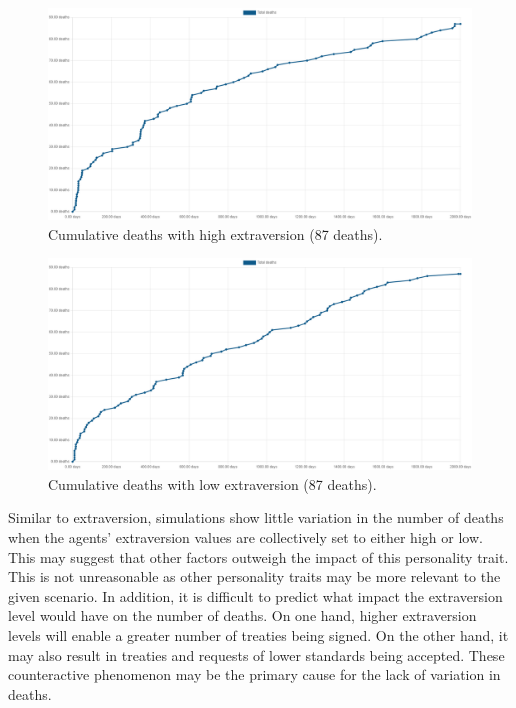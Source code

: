\begin{figure}[H]
    \begin{center}
        \includegraphics[scale=0.25]{009_team_7_agent_design/Images/Cumulative Deaths, With Treaties, T7Only, 2000days, 20food, High extra, 87deaths.png}
    \end{center}
    \caption{Cumulative deaths with high extraversion (87 deaths).}
    \label{fig: High Extraversion}
\end{figure}

\begin{figure}[H]
    \begin{center}
        \includegraphics[scale=0.25]{009_team_7_agent_design/Images/Cumulative Deaths, With Treaties, T7Only, 2000days, 20food, Low extra, 87deaths.png}
    \end{center}
    \caption{Cumulative deaths with low extraversion (87 deaths).}
    \label{fig: Low Extraversion}
\end{figure}

Similar to extraversion, simulations show little variation in the number of deaths when the agents' extraversion values are collectively set to either high or low. This may suggest that other factors outweigh the impact of this personality trait. This is not unreasonable as other personality traits may be more relevant to the given scenario. In addition, it is difficult to predict what impact the extraversion level would have on the number of deaths. On one hand, higher extraversion levels will enable a greater number of treaties being signed. On the other hand, it may also result in treaties and requests of lower standards being accepted. These counteractive phenomenon may be the primary cause for the lack of variation in deaths.


